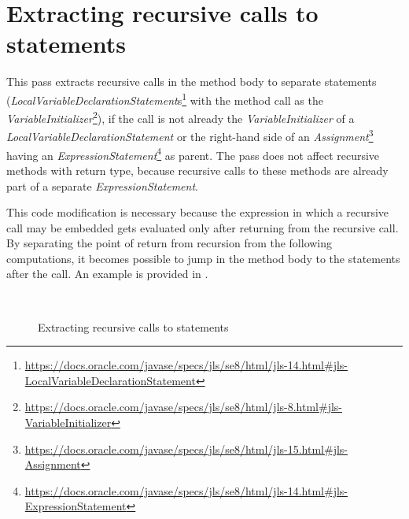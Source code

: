 \section{Extracting recursive calls to statements}

This pass extracts recursive calls in the method body to separate statements
(\textit{LocalVariableDeclarationStatement}s\footnote{\url{https://docs.oracle.com/javase/specs/jls/se8/html/jls-14.html#jls-LocalVariableDeclarationStatement}}
with the method call as the
\textit{VariableInitializer}\footnote{\url{https://docs.oracle.com/javase/specs/jls/se8/html/jls-8.html#jls-VariableInitializer}}),
if the call is not already the \textit{VariableInitializer} of a \textit{LocalVariableDeclarationStatement} or the
right-hand side of an \textit{Assignment}\footnote{\url{https://docs.oracle.com/javase/specs/jls/se8/html/jls-15.html#jls-Assignment}}
having an \textit{ExpressionStatement}\footnote{\url{https://docs.oracle.com/javase/specs/jls/se8/html/jls-14.html#jls-ExpressionStatement}}
as parent. The pass does not affect recursive methods with  return type, because recursive calls to these
methods are already part of a separate \textit{ExpressionStatement}.

This code modification is necessary because the expression in which a recursive call may be embedded gets evaluated
only after returning from the recursive call. By separating the point of return from recursion from the following
computations, it becomes possible to jump in the method body to the statements after the call. An example is provided
in .

\begin{figure}[htb]
    \\
    \caption{Extracting recursive calls to statements \label{img:extract}}
\end{figure}